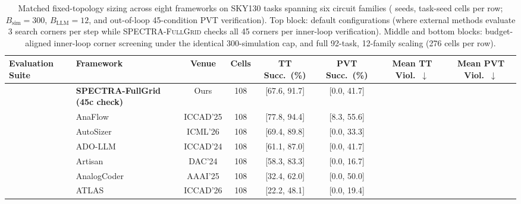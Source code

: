 \begin{table}[t]
\centering
\caption{Matched fixed-topology sizing across eight frameworks on \SizTasks{} SKY130 tasks spanning six circuit families (\SizSeeds{} seeds, \SizCells{} task-seed cells per row; $B_{\text{sim}}=300$, $B_{\text{LLM}}=12$, and out-of-loop 45-condition PVT verification). Top block: default configurations (where external methods evaluate 3 search corners per step while \textsc{SPECTRA-FullGrid} checks all 45 corners per inner-loop verification). Middle and bottom blocks: budget-aligned inner-loop corner screening under the identical 300-simulation cap, and full 92-task, 12-family scaling (276 cells per row).}
\label{tab:main}
\footnotesize
\setlength{\tabcolsep}{4.2pt}
\begin{adjustbox}{max width=\textwidth}
\begin{tabular}{@{}llcccccc@{}}
\toprule
Evaluation Suite & Framework & Venue & Cells & TT Succ.\ (\%) & PVT Succ.\ (\%) & Mean TT Viol.\ $\downarrow$ & Mean PVT Viol.\ $\downarrow$ \\
\midrule
{}
 & \textbf{SPECTRA-FullGrid (45c check)} & Ours & 108 & \SizSpectraTTPct{} [67.6, 91.7] & \SizSpectraPVTPct{} [0.0, 41.7] & \SizSpectraTTViol{} & \SizSpectraPVTViol{} \\
 & AnaFlow~\cite{ahmadzadeh2025anaflow} & ICCAD'25 & 108 & \textbf{\SizAnaFlowTTPct{}} [77.8, 94.4] & \textbf{\SizAnaFlowPVTPct{}} [8.3, 55.6] & \textbf{\SizAnaFlowTTViol{}} & \SizAnaFlowPVTViol{} \\
 & AutoSizer~\cite{yu2026autosizer} & ICML'26 & 108 & \SizAutoSizerTTPct{} [69.4, 89.8] & \SizAutoSizerPVTPct{} [0.0, 33.3] & \SizAutoSizerTTViol{} & \SizAutoSizerPVTViol{} \\
 & ADO-LLM~\cite{yin2024adollm} & ICCAD'24 & 108 & \SizADOLLMTTPct{} [61.1, 87.0] & \SizADOLLMPVTPct{} [0.0, 41.7] & \SizADOLLMTTViol{} & \SizADOLLMPVTViol{} \\
 & Artisan~\cite{chen2024artisan} & DAC'24 & 108 & \SizArtisanTTPct{} [58.3, 83.3] & \SizArtisanPVTPct{} [0.0, 16.7] & \SizArtisanTTViol{} & \SizArtisanPVTViol{} \\
 & AnalogCoder~\cite{lai2025analogcoder} & AAAI'25 & 108 & \SizAnalogCoderTTPct{} [32.4, 62.0] & \SizAnalogCoderPVTPct{} [0.0, 50.0] & \SizAnalogCoderTTViol{} & \SizAnalogCoderPVTViol{} \\
 & ATLAS~\cite{oh2026atlas} & ICCAD'26 & 108 & \SizATLASTTPct{} [22.2, 48.1] & \SizATLASPVTPct{} [0.0, 19.4] & \SizATLASTTViol{} & \SizATLASPVTViol{} \\

\end{tabular}
\end{adjustbox}
\end{table}
